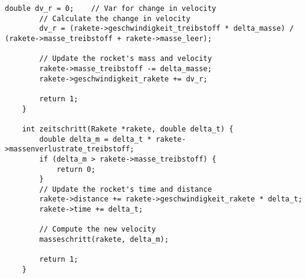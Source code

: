 \documentclass[12pt,a4paper]{article}
\begin{document}
\begin{lstlisting}[caption={Rocket},label={lst:p7002}]
        double dv_r = 0;    // Var for change in velocity
        // Calculate the change in velocity
        dv_r = (rakete->geschwindigkeit_treibstoff * delta_masse) / (rakete->masse_treibstoff + rakete->masse_leer);

        // Update the rocket's mass and velocity
        rakete->masse_treibstoff -= delta_masse;
        rakete->geschwindigkeit_rakete += dv_r;

        return 1;
    }

    int zeitschritt(Rakete *rakete, double delta_t) {
        double delta_m = delta_t * rakete->massenverlustrate_treibstoff;
        if (delta_m > rakete->masse_treibstoff) {
            return 0;
        }
        // Update the rocket's time and distance
        rakete->distance += rakete->geschwindigkeit_rakete * delta_t;
        rakete->time += delta_t;

        // Compute the new velocity
        masseschritt(rakete, delta_m);

        return 1;
    }
\end{lstlisting}
\end{document}
